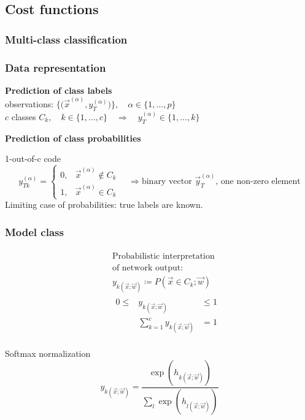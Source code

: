 \subsection{Cost functions}

\subsubsection{Multi-class classification}

\begin{frame}\frametitle{Data representation}
	\textbf{Prediction of class labels}\\[4mm]
	observations: $\Big\{ \Big( \vec{x}^{(\alpha)}, y_T^{(\alpha)} 
		\Big) \Big\}, \quad \alpha \in  \{1, \ldots, p\}$\\
			$c$ classes $C_k, \quad k \in \{1, \ldots, c\}
		\quad\Rightarrow\quad y_T^{(\alpha)} \in \{1, \ldots, k\}$
	\vspace{8mm}
	\pause
	
	\textbf{Prediction of class probabilities}\\
	\begin{block}{1-out-of-c code}
		\begin{equation*}
			y_{Tk}^{(\alpha)} = \left 
			\{ \begin{array}{lll}
			0, & \vec{x}^{(\alpha)} \notin C_k  \\
			1, & \vec{x}^{(\alpha)} \in C_k
			\end{array} \right.
			\quad \Rightarrow 
			\text{binary vector $\vec y_T^{(\alpha)}$, one non-zero element}
		\end{equation*}
		Limiting case of probabilities: true labels are known.
	\end{block}
\end{frame}


\begin{frame}\frametitle{Model class}
	\[ \begin{array}{ll}
		\begin{array}{l}
		\end{array}
		&
		\begin{array}{l}
			\text{Probabilistic interpretation} \\
			\text{of network output:}\\[1mm]
			y_{k (\vec{x};\vec{w})} \coloneqq P(\vec{x} \in C_k; \vec{w}) \\[2mm]
			\begin{array}{lcl}
				0 \leq & y_{k (\vec{x};\vec{w})} & \leq 1 \\[1mm]
					   & \sum\limits_{k=1}^c 
					   		y_{k (\vec{x};\vec{w})} & = 1
			\end{array}
		\end{array}
	\end{array} \]

	\begin{block}{Softmax normalization}
		$$
			y_{k (\vec{x};\vec{w})} = \frac{\exp(h_{k (\vec{x};\vec{w})})}{
				\sum_l \exp(h_{l (\vec{x};\vec{w})})}
		$$
	\end{block}
\end{frame}


